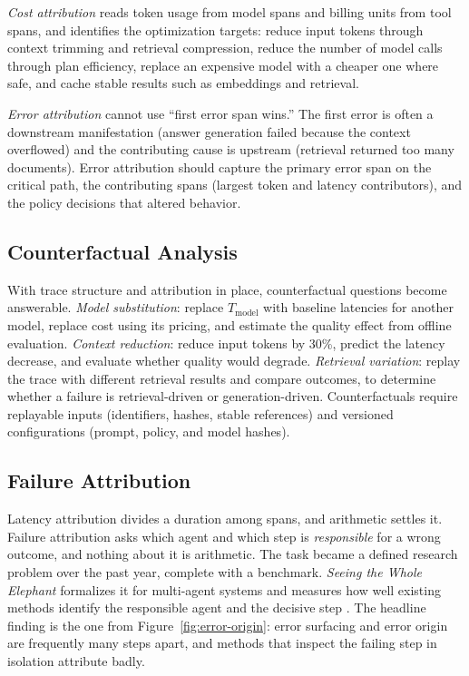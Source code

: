 \documentclass[11pt]{book}
\begin{document}
\textit{Cost attribution} reads token usage from model spans and billing units from tool spans, and identifies the optimization targets: reduce input tokens through context trimming and retrieval compression, reduce the number of model calls through plan efficiency, replace an expensive model with a cheaper one where safe, and cache stable results such as embeddings and retrieval.

\textit{Error attribution} cannot use ``first error span wins.'' The first error is often a downstream manifestation (answer generation failed because the context overflowed) and the contributing cause is upstream (retrieval returned too many documents). Error attribution should capture the primary error span on the critical path, the contributing spans (largest token and latency contributors), and the policy decisions that altered behavior.

\subsection{Counterfactual Analysis}

With trace structure and attribution in place, counterfactual questions become answerable. \textit{Model substitution}: replace $T_{\text{model}}$ with baseline latencies for another model, replace cost using its pricing, and estimate the quality effect from offline evaluation. \textit{Context reduction}: reduce input tokens by 30\%, predict the latency decrease, and evaluate whether quality would degrade. \textit{Retrieval variation}: replay the trace with different retrieval results and compare outcomes, to determine whether a failure is retrieval-driven or generation-driven. Counterfactuals require replayable inputs (identifiers, hashes, stable references) and versioned configurations (prompt, policy, and model hashes).

\subsection{Failure Attribution}

Latency attribution divides a duration among spans, and arithmetic settles it. Failure attribution asks which agent and which step is \textit{responsible} for a wrong outcome, and nothing about it is arithmetic. The task became a defined research problem over the past year, complete with a benchmark. \emph{Seeing the Whole Elephant} formalizes it for multi-agent systems and measures how well existing methods identify the responsible agent and the decisive step \cite{wholeelephant2026}. The headline finding is the one from Figure~\ref{fig:error-origin}: error surfacing and error origin are frequently many steps apart, and methods that inspect the failing step in isolation attribute badly.
\end{document}
